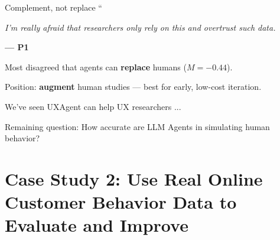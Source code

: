 \documentclass[scheme=plain,aspectratio=169]{beamer}
\renewcommand{\cite}{\footcite}
\begin{document}
\begin{frame}[c]{Complement, not replace}
  \centering
  {\color{barneg}\fontsize{42}{42}\selectfont ``}\par
  \vspace{-0.2em}
  \begin{minipage}{0.82\linewidth}\centering
    {\LARGE\itshape I'm really afraid that researchers only rely on this and overtrust such data.}
  \end{minipage}\par
  \vspace{0.5em}
  {\bfseries --- P1}\par
  \vspace{1.6em}
  {\small Most disagreed that agents can \textbf{replace} humans ($M=-0.44$).
  
  Position: \textbf{augment} human studies --- best for early, low-cost iteration.}
\end{frame}

\begin{frame}[standout]
  We've seen UXAgent can help UX researchers ...
  \vspace{10pt}
  \pause

  Remaining question: How accurate are LLM Agents in simulating human behavior?
\end{frame}

\section[Case Study 2: Can LLM Agents Simulate Multi-Turn Human Behavior?]{Case Study 2: Use Real Online Customer Behavior Data to Evaluate and Improve}


\end{document}
